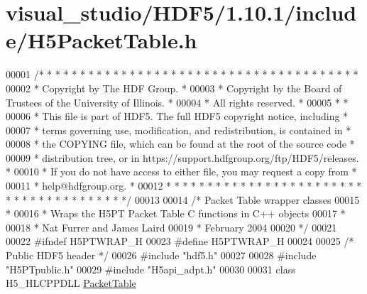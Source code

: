\hypertarget{visual__studio_2_h_d_f5_21_810_81_2include_2_h5_packet_table_8h_source}{}\section{visual\+\_\+studio/\+H\+D\+F5/1.10.1/include/\+H5\+Packet\+Table.h}
\label{visual__studio_2_h_d_f5_21_810_81_2include_2_h5_packet_table_8h_source}

\begin{DoxyCode}
00001 \textcolor{comment}{/* * * * * * * * * * * * * * * * * * * * * * * * * * * * * * * * * * * * * * *}
00002 \textcolor{comment}{ * Copyright by The HDF Group.                                               *}
00003 \textcolor{comment}{ * Copyright by the Board of Trustees of the University of Illinois.         *}
00004 \textcolor{comment}{ * All rights reserved.                                                      *}
00005 \textcolor{comment}{ *                                                                           *}
00006 \textcolor{comment}{ * This file is part of HDF5.  The full HDF5 copyright notice, including     *}
00007 \textcolor{comment}{ * terms governing use, modification, and redistribution, is contained in    *}
00008 \textcolor{comment}{ * the COPYING file, which can be found at the root of the source code       *}
00009 \textcolor{comment}{ * distribution tree, or in https://support.hdfgroup.org/ftp/HDF5/releases.  *}
00010 \textcolor{comment}{ * If you do not have access to either file, you may request a copy from     *}
00011 \textcolor{comment}{ * help@hdfgroup.org.                                                        *}
00012 \textcolor{comment}{ * * * * * * * * * * * * * * * * * * * * * * * * * * * * * * * * * * * * * * */}
00013 
00014 \textcolor{comment}{/* Packet Table wrapper classes}
00015 \textcolor{comment}{ *}
00016 \textcolor{comment}{ * Wraps the H5PT Packet Table C functions in C++ objects}
00017 \textcolor{comment}{ *}
00018 \textcolor{comment}{ * Nat Furrer and James Laird}
00019 \textcolor{comment}{ * February 2004}
00020 \textcolor{comment}{ */}
00021 
00022 \textcolor{preprocessor}{#ifndef H5PTWRAP\_H}
00023 \textcolor{preprocessor}{#define H5PTWRAP\_H}
00024 
00025 \textcolor{comment}{/* Public HDF5 header */}
00026 \textcolor{preprocessor}{#include "hdf5.h"}
00027 
00028 \textcolor{preprocessor}{#include "H5PTpublic.h"}
00029 \textcolor{preprocessor}{#include "H5api\_adpt.h"}
00030 
00031 \textcolor{keyword}{class }H5\_HLCPPDLL  \hyperlink{class_packet_table}{PacketTable}

\end{DoxyCode}
